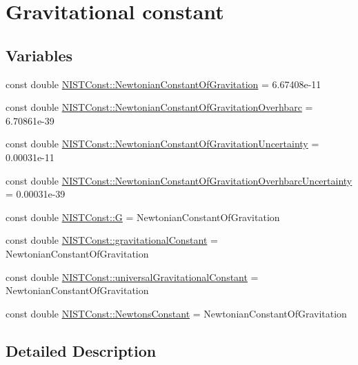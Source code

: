\hypertarget{group___gravitational_constant}{}\section{Gravitational constant}
\label{group___gravitational_constant}
\subsection*{Variables}
\begin{DoxyCompactItemize}
\item 
const double \hyperlink{group___gravitational_constant_gaba6371307f4cebde50b3c61a07c724c5}{N\+I\+S\+T\+Const\+::\+Newtonian\+Constant\+Of\+Gravitation} = 6.\+67408e-\/11
\item 
const double \hyperlink{group___gravitational_constant_gad7c8d8ef09f60e8f3f36f86f98df0472}{N\+I\+S\+T\+Const\+::\+Newtonian\+Constant\+Of\+Gravitation\+Overhbarc} = 6.\+70861e-\/39
\item 
const double \hyperlink{group___gravitational_constant_ga8fc40fce6dc42f5e84a3c908553e6586}{N\+I\+S\+T\+Const\+::\+Newtonian\+Constant\+Of\+Gravitation\+Uncertainty} = 0.\+00031e-\/11
\item 
const double \hyperlink{group___gravitational_constant_gaf10cbbd8ad1ece4ec01e35fe3d86854f}{N\+I\+S\+T\+Const\+::\+Newtonian\+Constant\+Of\+Gravitation\+Overhbarc\+Uncertainty} = 0.\+00031e-\/39
\item 
const double \hyperlink{group___gravitational_constant_gad3f54a7cdc3ea6fd2fbc4a30ce7df201}{N\+I\+S\+T\+Const\+::G} = Newtonian\+Constant\+Of\+Gravitation
\item 
const double \hyperlink{group___gravitational_constant_ga5a77947aedbfa6b29249f5b25f22137b}{N\+I\+S\+T\+Const\+::gravitational\+Constant} = Newtonian\+Constant\+Of\+Gravitation
\item 
const double \hyperlink{group___gravitational_constant_ga8d7552c043dbeda8e536ba6a01af9829}{N\+I\+S\+T\+Const\+::universal\+Gravitational\+Constant} = Newtonian\+Constant\+Of\+Gravitation
\item 
const double \hyperlink{group___gravitational_constant_ga3d83beb8e9a1e0970e5520fe8ca1ace5}{N\+I\+S\+T\+Const\+::\+Newtons\+Constant} = Newtonian\+Constant\+Of\+Gravitation
\end{DoxyCompactItemize}


\subsection{Detailed Description}


